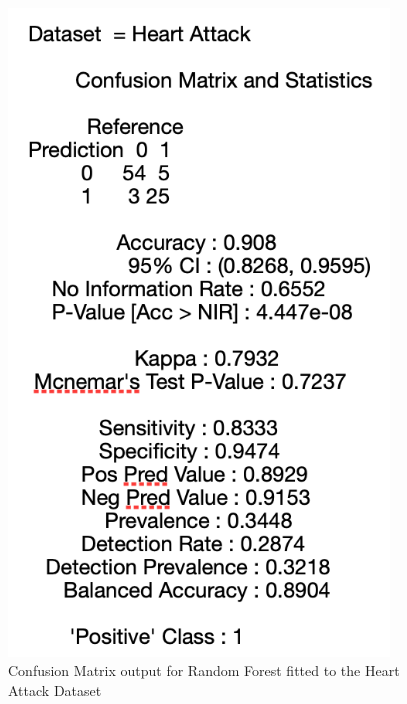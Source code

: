 \begin{figure}[!htbp]
\begin{minipage}{0.45\textwidth}
        \includegraphics[width=0.9\textwidth]{ThesisTemplate/appendix/images/Chapter5Appendix/ConfusionMatrix/HeartAttack.png} 
        \caption{Confusion Matrix output for Random Forest fitted to the Heart Attack Dataset}
        \label{fig:my_label}
    \end{minipage}
\end{figure}



